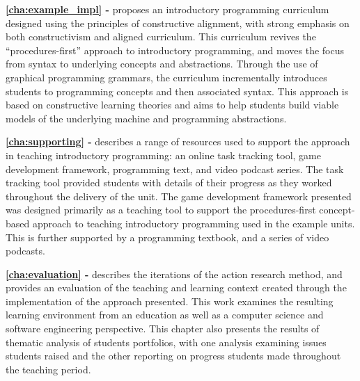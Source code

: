 \textbf{\cref{cha:example_impl} - } proposes an introductory programming curriculum designed using the principles of constructive alignment, with strong emphasis on both constructivism and aligned curriculum. This curriculum revives the ``procedures-first'' approach to introductory programming, and moves the focus from syntax to underlying concepts and abstractions. Through the use of graphical programming grammars, the curriculum incrementally introduces students to programming concepts and then associated syntax. This approach is based on constructive learning theories and aims to help students build viable models of the underlying machine and programming abstractions. 
 
\textbf{\cref{cha:supporting} - } describes a range of resources used to support the approach in teaching introductory programming: an online task tracking tool, game development framework, programming text, and video podcast series. The task tracking tool provided students with details of their progress as they worked throughout the delivery of the unit. The  game development framework presented was designed primarily as a teaching tool to support the procedures-first concept-based approach to teaching introductory programming used in the example units. This is further supported by a programming textbook, and a series of video podcasts. 

\textbf{\cref{cha:evaluation} - } describes the iterations of the action research method, and provides an evaluation of the teaching and learning context created through the implementation of the approach presented. This work examines the resulting learning environment from an education as well as a computer science and software engineering perspective. This chapter also presents the results of thematic analysis of students portfolios, with one analysis examining issues students raised and the other reporting on progress students made throughout the teaching period.


